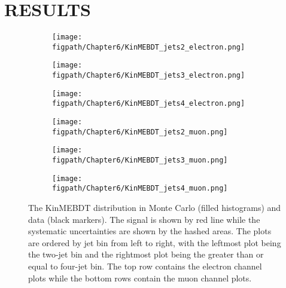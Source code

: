 %
%
%


\chapter{\texorpdfstring{\uppercase {Results}}{Results}}
\label{ch:results}

\begin{figure}[!hbtp]
    \centering
    \begin{subfigure}[t]{0.316\textwidth}
        \texttt{[image: \\figpath/Chapter6/KinMEBDT\_jets2\_electron.png]}
        \caption{}
        \label{fig:KinMEBDT_jets2_electron}
    \end{subfigure}
    \begin{subfigure}[t]{0.316\textwidth}
        \texttt{[image: \\figpath/Chapter6/KinMEBDT\_jets3\_electron.png]}
        \caption{}
        \label{fig:KinMEBDT_jets3_electron}
    \end{subfigure}
    \begin{subfigure}[t]{0.316\textwidth}
        \texttt{[image: \\figpath/Chapter6/KinMEBDT\_jets4\_electron.png]}
        \caption{}
        \label{fig:KinMEBDT_jets4_electron}
    \end{subfigure}

    \begin{subfigure}[t]{0.316\textwidth}
        \texttt{[image: \\figpath/Chapter6/KinMEBDT\_jets2\_muon.png]}
        \caption{}
        \label{fig:KinMEBDT_jets2_muon}
    \end{subfigure}
    \begin{subfigure}[t]{0.316\textwidth}
        \texttt{[image: \\figpath/Chapter6/KinMEBDT\_jets3\_muon.png]}
        \caption{}
        \label{fig:KinMEBDT_jets3_muon}
    \end{subfigure}
    \begin{subfigure}[t]{0.316\textwidth}
        \texttt{[image: \\figpath/Chapter6/KinMEBDT\_jets4\_muon.png]}
        \caption{}
        \label{fig:KinMEBDT_jets4_muon}
    \end{subfigure}
    \caption{The KinMEBDT distribution in Monte Carlo (filled histograms) and data (black markers). The \HWW signal is shown by red line while the systematic uncertainties are shown by the hashed areas. The plots are ordered by jet bin from left to right, with the leftmost plot being the two-jet bin and the rightmost plot being the greater than or equal to four-jet bin. The top row contains the electron channel plots while the bottom rows contain the muon channel plots.}
    \label{fig:KinMEBDT_final_templates}
\end{figure}

